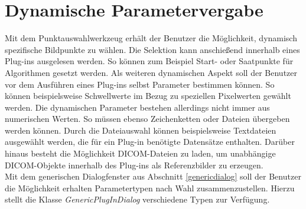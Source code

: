 \FloatBarrier
\section{Dynamische Parametervergabe} \label{dynamicParameter}

Mit dem Punktauswahlwerkzeug erhält der Benutzer die Möglichkeit, dynamisch spezifische Bildpunkte zu wählen. Die Selektion kann anschießend innerhalb eines Plug-ins ausgelesen werden. So können zum Beispiel Start- oder Saatpunkte für Algorithmen gesetzt werden. Als weiteren dynamischen Aspekt soll der Benutzer vor dem Ausführen eines Plug-ins selbst Parameter bestimmen können. So können beispielsweise Schwellwerte im Bezug zu speziellen Pixelwerten gewählt werden. Die dynamischen Parameter bestehen allerdings nicht immer aus numerischen Werten. So müssen ebenso Zeichenketten oder Dateien übergeben werden können. Durch die Dateiauswahl können beispielsweise Textdateien ausgewählt werden, die für ein Plug-in benötigte Datensätze enthalten. Darüber hinaus besteht die Möglichkeit DICOM-Dateien zu laden, um unabhängige DICOM-Objekte innerhalb des Plug-ins als Referenzbilder zu erzeugen.\\
Mit dem generischen Dialogfenster aus Abschnitt \ref{genericdialog} soll der Benutzer die Möglichkeit erhalten Parametertypen nach Wahl zusammenzustellen. Hierzu stellt die Klasse \textit{GenericPlugInDialog} verschiedene Typen zur Verfügung.

